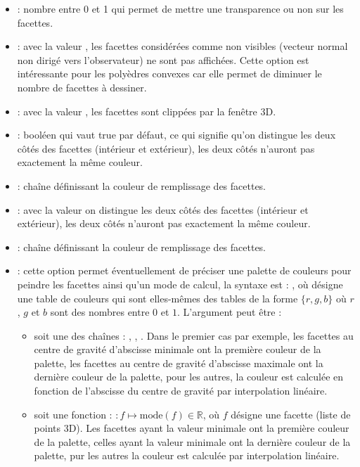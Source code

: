\begin{enumerate}
\begin{itemize}
        \item {} : nombre entre 0 et 1 qui permet de mettre une transparence ou non sur les facettes.
        \item {} : avec la valeur \true, les facettes considérées comme non visibles (vecteur normal non dirigé vers l'observateur) ne sont pas affichées. Cette option est intéressante pour les polyèdres convexes car elle permet de diminuer le nombre de facettes à dessiner.
        \item {} : avec la valeur \true, les facettes sont clippées par la fenêtre 3D.
        \item {} : booléen qui vaut true par défaut, ce qui signifie qu'on distingue les deux côtés des facettes (intérieur et extérieur), les deux côtés n'auront pas exactement la même couleur.
        \item {} : chaîne définissant la couleur de remplissage des facettes.
        \item {} : avec la valeur \true on distingue les deux côtés des facettes (intérieur et extérieur), les deux côtés n'auront pas exactement la même couleur.
        \item {} : chaîne définissant la couleur de remplissage des facettes.
        \item {} : cette option permet éventuellement de préciser une palette de couleurs pour peindre les facettes ainsi qu'un mode de calcul, la syntaxe est : , où  désigne une table de couleurs qui sont elles-mêmes des tables de la forme $\{r,g,b\}$ où $r$, $g$ et $b$ sont des nombres entre $0$ et $1$. L'argument   peut être :
            \begin{itemize}
                \item soit une des chaînes : , , . Dans le premier cas par exemple, les facettes au centre de gravité d'abscisse minimale ont la première couleur de la palette, les facettes au centre de gravité d'abscisse maximale ont la dernière couleur de la palette, pour les autres, la couleur est calculée en fonction de l'abscisse du centre de gravité par interpolation linéaire.
                \item soit une fonction : $\colon f \mapsto \mathrm{mode}(f)\in\mathbb R$, où $f$ désigne une facette (liste de points 3D). Les facettes ayant la valeur minimale ont la première couleur de la palette, celles ayant la valeur minimale ont la dernière couleur de la palette, pur les autres la couleur est calculée par interpolation linéaire.
            \end{itemize}    
        \end{itemize}
    

\end{enumerate}
